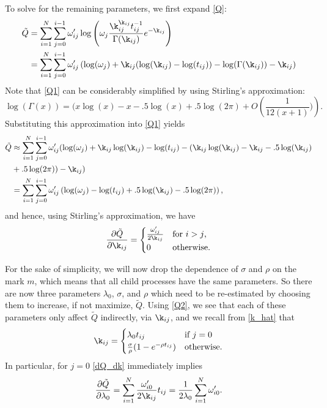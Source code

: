 \documentclass[12pt,leqno]{article}
\begin{document}
To solve for the remaining parameters, we first expand \eqref{Q}:
\begin{equation}\label{Q1}
  \begin{split}
    \tilde{Q} &= \sum_{i=1}^N\sum_{j=0}^{i-1}\omega'_{ij}\log\left(\omega_j\frac{\k_{ij}^{\k_{ij}}t_{ij}^{-1}}
          {\Gamma(\k_{ij})}e^{-\k_{ij}} \right)\\
    &= \sum_{i=1}^N\sum_{j=0}^{i-1}\omega'_{ij}\left(\log(\omega_j)+\k_{ij}(\log(\k_{ij}) - \log(t_{ij})) 
          -\log(\Gamma(\k_{ij})) -\k_{ij}\right)\\
  \end{split}
\end{equation}
Note that \eqref{Q1} can be considerably simplified by using Stirling's approximation:
\begin{equation}\label{stirling}
  \log(\Gamma(x)) =  (x\log(x) -x - .5\log(x) + .5\log(2\pi) + O\left(\frac{1}{12(x+1)})\right).%
\end{equation}
Substituting this approximation into \eqref{Q1} yields
\begin{equation}\label{Q2}
  \begin{split}
    \tilde{Q} &\approx \sum_{i=1}^N\sum_{j=0}^{i-1}\omega'_{ij}(\log(\omega_j)+\k_{ij}\log(\k_{ij}) - \log(t_{ij})
    -(\k_{ij}\log(\k_{ij}) -\k_{ij} -.5\log(\k_{ij}) \\
    &+ .5\log(2\pi)) -\k_{ij})\\
  &= \sum_{i=1}^N\sum_{j=0}^{i-1}\omega'_{ij}\left(\log(\omega_j) - \log(t_{ij}) + .5\log(\k_{ij})
  - .5\log(2\pi) \right),
  \end{split}
\end{equation}
and hence, using Stirling's approximation, we have 
\begin{equation}\label{dQ_dk}
  \frac{\partial\tilde{Q}}{\partial\k_{ij}} = \begin{cases}
\frac{\omega'_{ij}}{2\k_{ij}}&\text{for $i > j$,}\\
0 & \text{otherwise}.
\end{cases}
\end{equation}


For the sake of simplicity, we will now drop the dependence of $\sigma$ and $\rho$ on the mark $m$, which means
that all child processes have the same parameters.  So there are now three parameters $\lambda_0$, $\sigma$, and
$\rho$ which need to be re-estimated by choosing them to increase, if not maximize, $\tilde{Q}$.  
Using \eqref{Q2}, we see that each of these parameters only affect $\tilde{Q}$ indirectly, via $\k_{ij}$, and we recall
from \eqref{k_hat} that
$$
\k_{ij} = \begin{cases}
\lambda_0t_{ij} & \text{if $j = 0$}\\
\frac{\sigma}{\rho}(1-e^{-\rho{t_{ij}}}) & \text{otherwise}.
\end{cases}
$$
In particular, for $j = 0$ \eqref{dQ_dk} immediately implies
\begin{equation}\label{dQ_dlambda}
\frac{\partial\tilde{Q}}{\partial\lambda_0} = \sum_{i=1}^N\frac{\omega'_{i0}}{2\k_{ij}}t_{ij} 
= \frac{1}{2\lambda_0}\sum_{i=1}^N\omega'_{i0}.
\end{equation}
\end{document}
